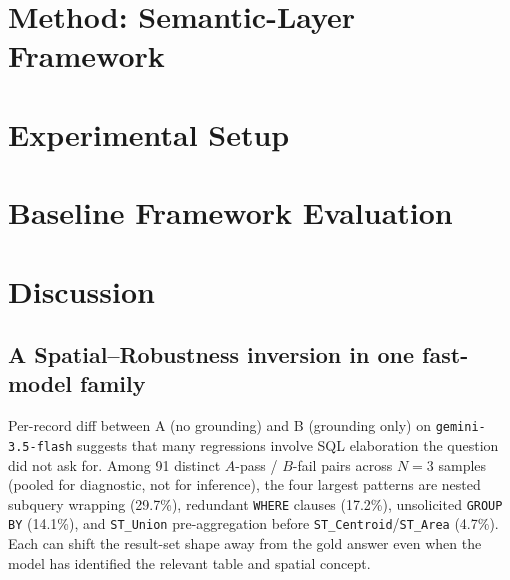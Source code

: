 \documentclass[11pt]{article}
\begin{document}


\section{Method: Semantic-Layer Framework}
\label{sec:method}



\section{Experimental Setup}
\label{sec:experiments}



\section{Baseline Framework Evaluation}
\label{sec:baseline-results}





\section{Discussion}
\label{sec:discussion}

\subsection{A Spatial--Robustness inversion in one fast-model family}
\label{sec:discussion:why}

Per-record diff between A (no grounding) and B (grounding only) on \texttt{gemini-3.5-flash} suggests that many regressions involve SQL elaboration the question did not ask for. Among 91 distinct $A$-pass / $B$-fail pairs across $N=3$ samples (pooled for diagnostic, not for inference), the four largest patterns are nested subquery wrapping (29.7\%), redundant \texttt{WHERE} clauses (17.2\%), unsolicited \texttt{GROUP BY} (14.1\%), and \texttt{ST\_Union} pre-aggregation before \texttt{ST\_Centroid}/\texttt{ST\_Area} (4.7\%). Each can shift the result-set shape away from the gold answer even when the model has identified the relevant table and spatial concept.
\end{document}
